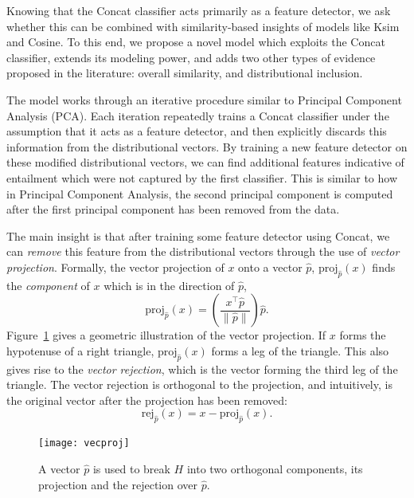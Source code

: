 \documentclass[letterpaper]{article}
\begin{document}
Knowing that the Concat classifier acts primarily as a feature detector, we
ask whether this can be combined with similarity-based insights of models like
Ksim and Cosine. To this end, we propose a novel model which exploits the
Concat classifier, extends its modeling power, and adds two other types of
evidence proposed in the literature: overall similarity, and distributional
inclusion.


The model works through an iterative procedure similar to Principal Component
Analysis (PCA). Each iteration repeatedly trains a Concat classifier under the
assumption that it acts as a feature detector, and then explicitly discards
this information from the distributional vectors. By training a new feature
detector on these modified distributional vectors, we can find additional
features indicative of entailment which were not captured by the first
classifier. This is similar to how in Principal Component Analysis, the
second principal component is computed after the first principal component
has been removed from the data.

The main insight is that after training some feature detector using Concat,
we can {\em remove} this feature from the distributional vectors through
the use of {\em vector projection}.
Formally, the vector projection of $x$ onto
a vector $\hat p$, $\text{proj}_{\hat p}(x)$ finds the {\em component} of $x$
which is in the direction of $\hat p$,
\begin{equation*}
  \text{proj}_{\hat p}(x) = \left(\frac{x^\top\hat p}{\|\hat p\|}\right)\hat p.
\end{equation*}
Figure~\ref{fig:vecproj} gives a geometric illustration of the vector
projection. If $x$ forms the hypotenuse of a right
triangle, $\text{proj}_{\hat p}(x)$ forms a leg of the triangle. This also
gives rise to the {\em vector rejection}, which is the vector forming the third
leg of the triangle. The vector rejection is orthogonal to the projection, and
intuitively, is the original vector after the projection has been removed:
\begin{equation*}
  \text{rej}_{\hat p}(x) = x - \text{proj}_{\hat p}(x).
\end{equation*}

\begin{figure}
  \begin{center}
  \texttt{[image: vecproj]}
\end{center}
\caption{A vector $\hat p$ is used to break $H$ into two orthogonal components,
its projection and the rejection over $\hat p$.}
\label{fig:vecproj}
\end{figure}
\end{document}
